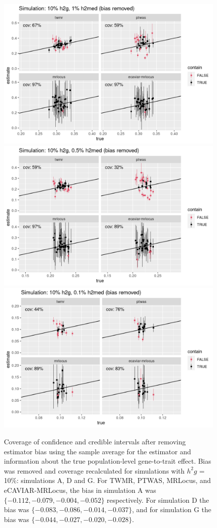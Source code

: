 \documentclass[11pt]{article}
\begin{document}
\begin{figure}[!ht]
  \centering
  \includegraphics[width=.49\textwidth]{figs/cover1_minus_bias.png} 
  \includegraphics[width=.49\textwidth]{figs/cover4_minus_bias.png} \\
  \includegraphics[width=.49\textwidth]{figs/cover5_minus_bias.png}
  \caption{Coverage of confidence and credible intervals after
    removing estimator bias using the sample average for the estimator
    and information about the true population-level gene-to-trait
    effect. Bias was removed and coverage recalculated for simulations
    with $h^2g$ = 10\%: simulations A, D and G. For TWMR, PTWAS, MRLocus,
    and eCAVIAR-MRLocus, the bias in simulation A was
    $\{-0.112, -0.079, -0.004, -0.052\}$ respectively.
    For simulation D the bias was
    $\{-0.083, -0.086, -0.014, -0.037\}$,
    and for simulation G the bias was
    $\{-0.044, -0.027, -0.020, -0.028\}$.}
\end{figure}
\end{document}
